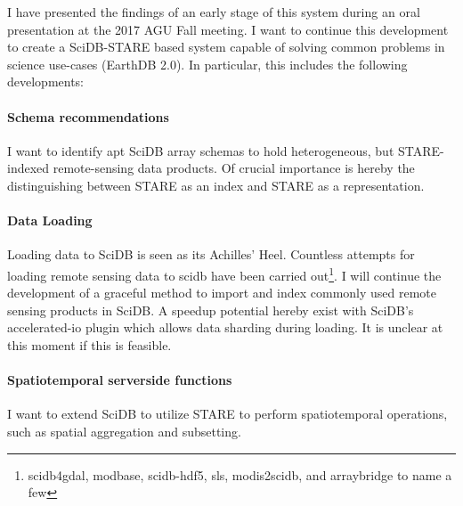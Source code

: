 \documentclass[letterpaper, parskip=half]{scrartcl}
\begin{document}
I have presented the findings of an early stage of this system during an oral presentation at the 2017 \gls{AGU} Fall meeting. I want to continue this development to create a SciDB-STARE based system capable of solving common problems in science use-cases (EarthDB 2.0). In particular, this includes the following developments:

\paragraph{Schema recommendations}
I want to identify apt SciDB array schemas to hold heterogeneous, but STARE-indexed remote-sensing data products. 
Of crucial importance is hereby the distinguishing between STARE as an index and STARE as a representation.


\paragraph{Data Loading}
Loading data to SciDB is seen as its Achilles' Heel. Countless attempts for loading remote sensing data to scidb have been carried out\footnote{scidb4gdal, modbase, scidb-hdf5, sls, modis2scidb, and arraybridge to name a few}. 
I will continue the development of a graceful method to import and index commonly used remote sensing products in SciDB.
A speedup potential hereby exist with SciDB's accelerated-io plugin which allows data sharding during loading. It is unclear at this moment if this is feasible.



\paragraph{Spatiotemporal serverside functions}
I want to extend SciDB to utilize STARE to perform spatiotemporal operations, such as spatial aggregation and subsetting.
\end{document}
